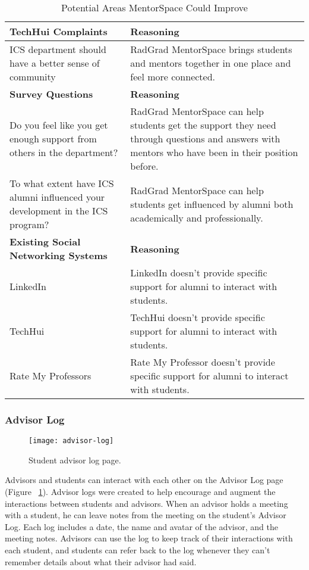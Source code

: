 \begin{table}[htbp!]
\centering
 \caption{Potential Areas MentorSpace Could Improve}
\begin{tabular}{  |p{4cm}|p{12cm}| } 
\hline
 \textbf{TechHui Complaints} & \textbf{Reasoning} \\ 
  \hline
  ICS department should have a better sense of community & RadGrad MentorSpace brings students and mentors together in one place and feel more connected.\\
  \hline
 \textbf{Survey Questions} & \textbf{Reasoning} \\ 
  \hline
  Do you feel like you get enough support from others in the department? & RadGrad MentorSpace can help students get the support they need through questions and answers with mentors who have been in their position before. \\
  \hline
    To what extent have ICS alumni influenced your development in the ICS program? & RadGrad MentorSpace can help students get influenced by alumni both academically and professionally. \\
   \hline
   \textbf{Existing Social Networking Systems} & \textbf{Reasoning} \\ 
  \hline
  LinkedIn & LinkedIn doesn't provide specific support for alumni to interact with students. \\
    \hline
  TechHui & TechHui doesn't provide specific support for alumni to interact with students. \\
    \hline
  Rate My Professors & Rate My Professor doesn't provide specific support for alumni to interact with students. \\
    \hline
    \end{tabular}
\end{table}

\subsubsection{Advisor Log}

\begin{figure}[htbp!]
\centering
\texttt{[image: advisor-log]}
\caption{Student advisor log page.}
\label{advisor-log}
\end{figure}
Advisors and students can interact with each other on the Advisor Log page (Figure ~\ref{advisor-log}). Advisor logs were created to help encourage and augment the interactions between students and advisors. When an advisor holds a meeting with a student, he can leave notes from the meeting on the student's Advisor Log. Each log includes a date, the name and avatar of the advisor, and the meeting notes. Advisors can use the log to keep track of their interactions with each student, and students can refer back to the log whenever they can't remember details about what their advisor had said. 

